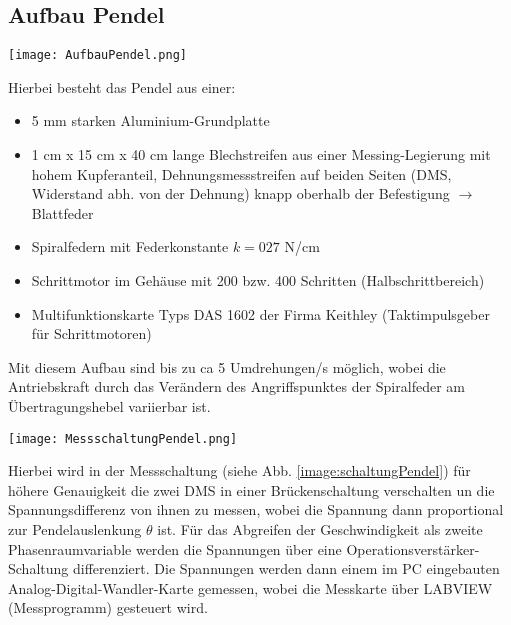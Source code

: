 \subsection{Aufbau Pendel}
\label{sub:aufbauPendel}
\begin{center}
    \texttt{[image: AufbauPendel.png]}
    \label{image:aufbauPendel}
\end{center}
Hierbei besteht das Pendel aus einer:
\begin{itemize}
    \item 5 mm starken Aluminium-Grundplatte
    \item 1 cm x 15 cm x 40 cm lange Blechstreifen aus einer Messing-Legierung mit hohem Kupferanteil, Dehnungsmessstreifen auf beiden Seiten (DMS, Widerstand abh. von der Dehnung) knapp oberhalb der Befestigung $\rightarrow$ Blattfeder
    \item Spiralfedern mit Federkonstante $k=027$ N/cm 
    \item Schrittmotor im Gehäuse mit 200 bzw. 400 Schritten (Halbschrittbereich)
    \item Multifunktionskarte Typs DAS 1602 der Firma Keithley (Taktimpulsgeber für Schrittmotoren)
\end{itemize}
Mit diesem Aufbau sind bis zu ca 5 Umdrehungen/s möglich, wobei die Antriebskraft durch das Verändern des Angriffspunktes der Spiralfeder am Übertragungshebel variierbar ist.
\begin{center}
    \texttt{[image: MessschaltungPendel.png]}
    \label{image:schaltungPendel}
\end{center}
Hierbei wird in der Messschaltung (siehe Abb. \ref{image:schaltungPendel}) für höhere Genauigkeit die zwei DMS in einer Brückenschaltung verschalten un die Spannungsdifferenz von ihnen zu messen, wobei die Spannung dann proportional zur Pendelauslenkung $\theta$ ist. Für das Abgreifen der Geschwindigkeit als zweite Phasenraumvariable werden die Spannungen über eine Operationsverstärker-Schaltung differenziert. Die Spannungen werden dann einem im PC eingebauten Analog-Digital-Wandler-Karte gemessen, wobei die Messkarte über LABVIEW (Messprogramm) gesteuert wird.
